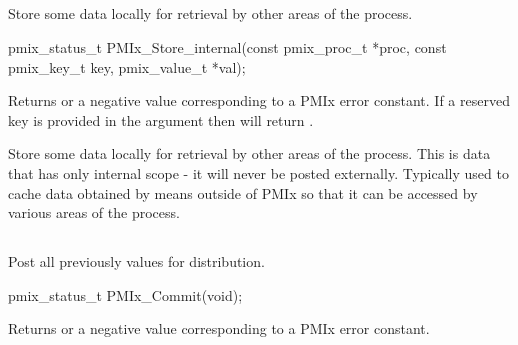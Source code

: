 \subsection{}

\summary

Store some data locally for retrieval by other areas of the process.

\format

\cspecificstart
\begin{codepar}
pmix_status_t
PMIx_Store_internal(const pmix_proc_t *proc,
                    const pmix_key_t key,
                    pmix_value_t *val);
\end{codepar}
\cspecificend

\begin{arglist}
\end{arglist}

Returns  or a negative value corresponding to a PMIx error constant.
If a reserved key is provided in the  argument then  will return .

\descr

Store some data locally for retrieval by other areas of the process.
This is data that has only internal scope - it will never be posted externally. Typically used to cache data obtained by means outside of \ac{PMIx} so that it can be accessed by various areas of the process.


\subsection{}

\summary

Post all previously  values for distribution.

\format

\cspecificstart
\begin{codepar}
pmix_status_t PMIx_Commit(void);
\end{codepar}
\cspecificend

Returns  or a negative value corresponding to a PMIx error constant.

